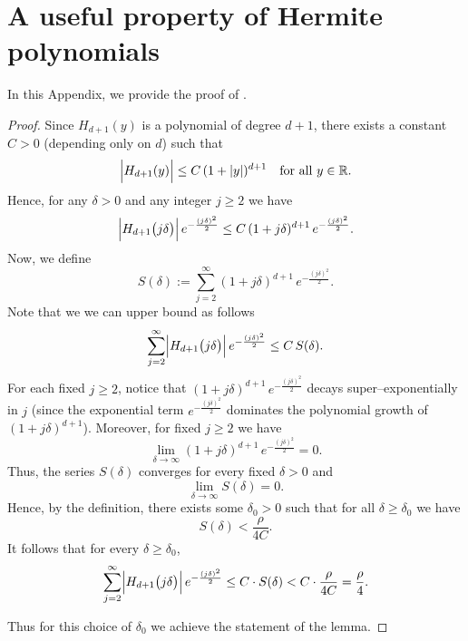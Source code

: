 \section{A useful property of Hermite polynomials}\label{app: useful}
In this Appendix, we provide the proof of .

\begin{proof}
Since \( H_{d+1}(y) \) is a polynomial of degree \( d+1 \), there exists a constant \( C > 0 \) (depending only on \( d \)) such that
\[
\Bigl| H_{d+1}(y) \Bigr| \le C \,(1+|y|)^{d+1} \quad \text{for all } y \in \mathbb{R}.
\]
Hence, for any \(\delta>0\) and any integer \( j\ge 2 \) we have
\[
\Bigl| H_{d+1}\bigl(j\delta\bigr) \Bigr|\, e^{-\frac{(j\delta)^2}{2}}
\le C \,(1+j\delta)^{d+1}\, e^{-\frac{(j\delta)^2}{2}}.
\]
Now, we define
\[
S(\delta) := \sum_{j=2}^\infty (1+j\delta)^{d+1}\, e^{-\frac{(j\delta)^2}{2}}.
\]
Note that we we can upper bound as follows
\[
\sum_{j=2}^\infty \Bigl| H_{d+1}\bigl(j\delta\bigr) \Bigr|\, e^{-\frac{(j\delta)^2}{2}}
\le C\, S(\delta).
\]
For each fixed \( j \ge 2 \), notice that $(1+j\delta)^{d+1}\, e^{-\frac{(j\delta)^2}{2}}$
decays super--exponentially in \( j \) (since the exponential term \( e^{-\frac{(j\delta)^2}{2}} \) dominates the polynomial growth of \((1+j\delta)^{d+1}\)). Moreover, for fixed \( j\ge2 \) we have
\[
\lim_{\delta\to\infty} (1+j\delta)^{d+1}\, e^{-\frac{(j\delta)^2}{2}} = 0.
\]
Thus, the series \( S(\delta) \) converges for every fixed \(\delta > 0\) and
\[
\lim_{\delta\to\infty} S(\delta) = 0.
\]
Hence, by the definition, there exists some \(\delta_0 > 0\) such that for all \(\delta \ge \delta_0\) we have
\[
S(\delta) < \frac{\rho}{4C}.
\]
It follows that for every \(\delta \ge \delta_0\),
\[
\sum_{j=2}^\infty \Bigl| H_{d+1}\bigl(j\delta\bigr) \Bigr|\, e^{-\frac{(j\delta)^2}{2}}
\le C\cdot S(\delta) < C\cdot \frac{\rho}{4C} = \frac{\rho}{4}.
\]

Thus for this choice of $\delta_0$ we achieve the statement of the lemma.
\end{proof}